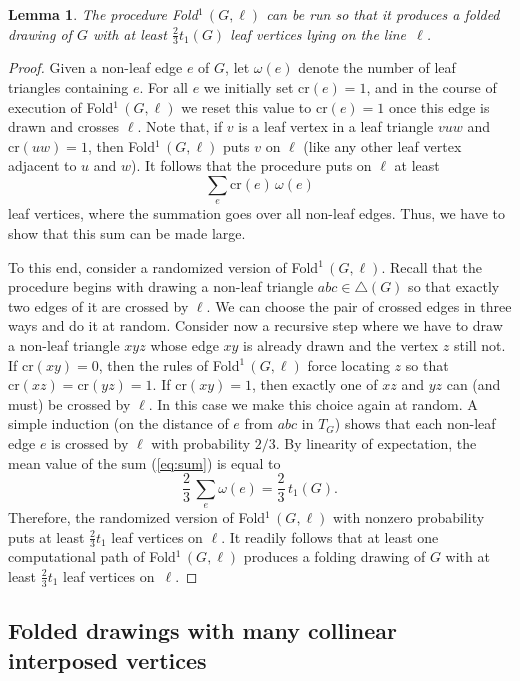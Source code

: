 \documentclass[reqno,12pt]{amsart}
\newcommand{\fold}[2]{{\sc Fold}$^{#1}\,(#2)$}
\newcommand{\cross}[1]{\mathrm{cr}(#1)}
\newcommand{\refeq}[1]{(\ref{eq:#1})}
\newtheorem{lemma}[theorem]{Lemma}
\begin{document}
\smallskip

\begin{lemma}\label{lem:fold1}
The procedure \fold1{G,\ell} can be run so that it produces a folded drawing
of $G$ with at least $\frac23t_1(G)$ leaf vertices lying on the line~$\ell$.
\end{lemma}

\begin{proof}
Given a non-leaf edge $e$ of $G$, let $\omega(e)$ denote the number of leaf
triangles containing $e$. For all $e$ we initially set $\cross e=1$, and
in the course of execution of \fold1{G,\ell} we reset this value to $\cross e=1$
once this edge is drawn and crosses $\ell$.
Note that, if $v$ is a leaf vertex in a leaf triangle $vuw$
and $\cross{uw}=1$, then \fold1{G,\ell} puts $v$ on $\ell$
(like any other leaf vertex adjacent to $u$ and $w$).
It follows that the procedure puts on $\ell$ at least
\begin{equation}\label{eq:sum}
\sum_e\cross e\,\omega(e)
\end{equation}
leaf vertices, where the summation goes over all non-leaf edges.
Thus, we have to show that this sum can be made large.

To this end, consider a randomized version of \fold1{G,\ell}.
Recall that the procedure begins with drawing a non-leaf triangle $abc\in\triangle(G)$ 
so that exactly two edges of it are crossed by $\ell$.
We can choose the pair of crossed edges in three ways and do it at random.
Consider now a recursive step where we have to draw a non-leaf triangle
$xyz$ whose edge $xy$ is already drawn and the vertex $z$ still not.
If $\cross{xy}=0$, then the rules of \fold1{G,\ell} force locating
$z$ so that $\cross{xz}=\cross{yz}=1$. If $\cross{xy}=1$, then exactly one
of $xz$ and $yz$ can (and must) be crossed by $\ell$. In this case
we make this choice again at random.
A simple induction (on the distance of $e$ from $abc$ in $T_G$)
shows that each non-leaf edge $e$ is crossed by $\ell$ with probability $2/3$.
By linearity of expectation, the mean value of the sum \refeq{sum} is equal to
$$
\frac23\,\sum_e\omega(e)=\frac23\,t_1(G).
$$
Therefore, the randomized version of \fold1{G,\ell} with nonzero probability puts
at least $\frac23t_1$ leaf vertices on $\ell$.
It readily follows that at least one computational path of \fold1{G,\ell}
produces a folding drawing of $G$ with at least $\frac23t_1$ leaf vertices on~$\ell$.
\end{proof}



\subsection{Folded drawings with many collinear interposed vertices}\label{ss:fold2}
\end{document}
